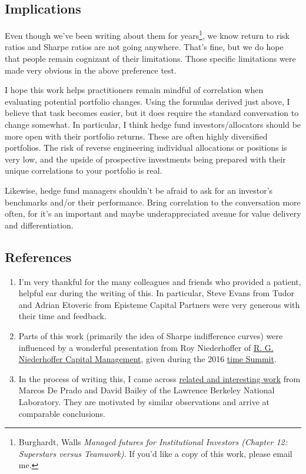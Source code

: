 \documentclass[]{article}
\providecommand{\tightlist}{%
  \setlength{\itemsep}{0pt}\setlength{\parskip}{0pt}}
\let\rmarkdownfootnote\footnote%
\def\footnote{\protect\rmarkdownfootnote}
\begin{document}
\hypertarget{implications}{%
\subsection{Implications}\label{implications}}

Even though we've been writing about them for years\footnote{Burghardt,
  Walls \emph{Managed futures for Institutional Investors (Chapter 12:
  Superstars versus Teamwork)}. If you'd like a copy of this work,
  please email me.}, we know return to risk ratios and Sharpe ratios are
not going anywhere. That's fine, but we do hope that people remain
cognizant of their limitations. Those specific limitations were made
very obvious in the above preference test.

I hope this work helps practitioners remain mindful of correlation when
evaluating potential portfolio changes. Using the formulas derived just
above, I believe that task becomes easier, but it does require the
standard conversation to change somewhat. In particular, I think hedge
fund investors/allocators should be more open with their portfolio
returns. These are often highly diversified portfolios. The risk of
reverse engineering individual allocations or positions is very low, and
the upside of prospective investments being prepared with their unique
correlations to your portfolio is real.

Likewise, hedge fund managers shouldn't be afraid to ask for an
investor's benchmarks and/or their performance. Bring correlation to the
conversation more often, for it's an important and maybe
underappreciated avenue for value delivery and differentiation.

\hypertarget{references}{%
\subsection{References}\label{references}}

\begin{enumerate}
\def\labelenumi{\arabic{enumi}.}
\tightlist
\item
  I'm very thankful for the many colleagues and friends who provided a
  patient, helpful ear during the writing of this. In particular, Steve
  Evans from Tudor and Adrian Etoveric from Episteme Capital Partners
  were very generous with their time and feedback.
\item
  Parts of this work (primarily the idea of Sharpe indifference curves)
  were influenced by a wonderful presentation from Roy Niederhoffer of
  \href{https://www.niederhoffer.com/}{R. G. Niederhoffer Capital
  Management}, given during the 2016 \href{https://timesummit.org/}{time
  Summit}.
\item
  In the process of writing this, I came across
  \href{https://pdfs.semanticscholar.org/c094/f7fd32f6e5c36f121a0d246d6127587a473a.pdf}{related
  and interesting work} from Marcos De Prado and David Bailey of the
  Lawrence Berkeley National Laboratory. They are motivated by similar
  observations and arrive at comparable conclusions.
\end{enumerate}
\end{document}
